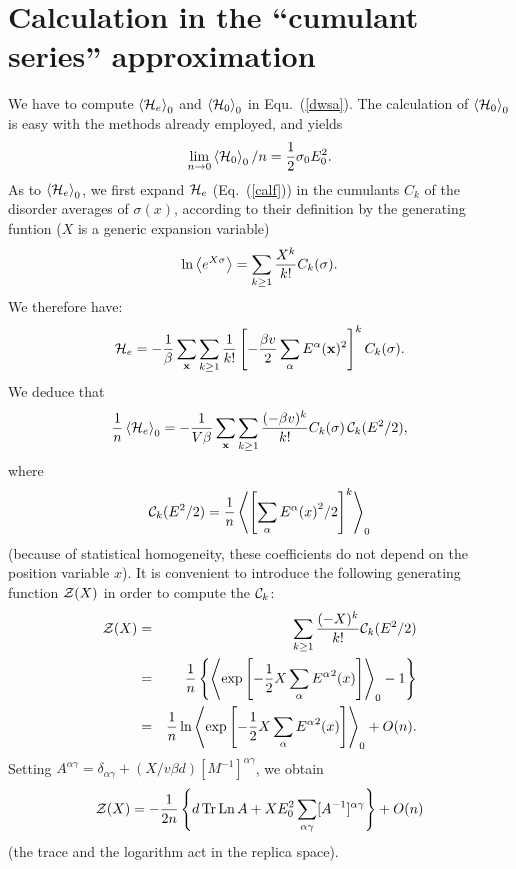 \section{Calculation in the ``cumulant series'' approximation}
\label{co}
We have to compute $\left\langle {\cal H}_e\right\rangle_0$ and 
$\left\langle {\cal H}_0\right\rangle_0$ in Equ.\ (\ref{dwsa}).
The calculation of $\left\langle {\cal H}_0\right\rangle_0$ is easy
with the methods already employed, and yields
\begin{equation}
\lim_{n\to 0}\left\langle 
{\cal H}_0\right\rangle_0/n =\frac{1}{2}\sigma_0 E_0^2.
\end{equation}
As to $\left\langle {\cal H}_e\right\rangle_0$, 
we first expand ${\cal H}_e$ (Eq.\ (\ref{calf})) in the cumulants
$C_k$ of the disorder averages of $\sigma(x)$, according to their
definition by the generating funtion ($X$ is a generic expansion
variable)
\begin{equation}
\ln\left<e^{X\sigma}\right>=\sum_{k\ge 1} {X^k\over k!}C_k(\sigma).
\end{equation}
We therefore have:
\begin{equation}
\label{fexpand}
{\cal H}_e=-{1\over \beta}\sum_{\bf x}\sum_{k\ge 1}{1\over k!}
\left[-{\beta v\over 2}\sum_\alpha {E^\alpha}({\bf x})^2\right]^k
C_k(\sigma).
\end{equation}
We deduce that
\begin{equation}
\label{fob}
{1\over n}\left\langle{\cal H}_e\right\rangle_0=-{1\over V\beta}
\sum_{\bf x}\sum_{k\ge
1}{(-\beta v)^k\over k!}  C_k(\sigma)\,{\cal C}_k(E^2/2),
\end{equation}
where
\begin{equation}
\label{calck}
{\cal C}_k(E^2/2)={1\over n} 
\left\langle \left[\sum_\alpha {E^\alpha(x)}^2/2\right]^k
\right\rangle_0
\end{equation}
(because of statistical homogeneity, these coefficients do not depend
on the position variable $x$). It is convenient to introduce the
following generating function ${\cal Z}(X)$ in order to compute the ${\cal C}_k$:
\begin{eqnarray}
{\cal Z}(X)&=&\sum_{k\geq 1} {(-X)^k\over k!}{\cal C}_k(E^2/2)
\nonumber\\
&=&{1\over n} \left\{\left\langle\exp\left[-{1\over 2}X 
\sum_\alpha{E^\alpha}^2(x)\right]
\right\rangle_0-1\right\}
\nonumber\\ 
&=&{1\over n}\ln\left\langle\exp
\left[-{1\over 2}X \sum_\alpha{E^\alpha}^2(x)\right]
\right\rangle_0+O(n).
\end{eqnarray}
Setting $A^{\alpha\gamma}=\delta_{\alpha\gamma}+(X/v\beta d) [M^{-1}]^{\alpha\gamma}$, we obtain \cite{NOTE2}
\begin{equation}
\label{zx}
{\cal Z}(X)=-{1\over 2n} \left\{d\mathop{\text{Tr}}
\mathop{\text{Ln}} A+X E_0^2
\sum_{\alpha\gamma} [A^{-1}]^{\alpha\gamma}\right\}+O(n)
\end{equation}
(the trace and the logarithm act in the replica space).

